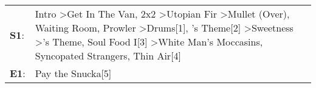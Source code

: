 \begin{supertabular}{p{0.03\textwidth}p{0.92\textwidth}}
 \textbf{S1}:  &  Intro\textsuperscript{} \textgreater \enspace Get In The Van\textsuperscript{}, \enspace 2x2\textsuperscript{} \textgreater \enspace Utopian Fir\textsuperscript{} \textgreater \enspace Mullet (Over)\textsuperscript{}, \enspace Waiting Room\textsuperscript{}, \enspace Prowler\textsuperscript{} \textgreater \enspace Drums[1]\textsuperscript{}, 's Theme[2]\textsuperscript{} \textgreater \enspace Sweetness\textsuperscript{} \textgreater {}'s Theme\textsuperscript{}, \enspace Soul Food I[3]\textsuperscript{} \textgreater \enspace White Man's Moccasins\textsuperscript{}, \enspace Syncopated Strangers\textsuperscript{}, \enspace Thin Air[4]\textsuperscript{}  \enspace  \\
 \textbf{E1}:  &                                                                                                                                                                                                                                                                                                                                                                                                                                                                                                                                                                                                                                                                      Pay the Snucka[5]\textsuperscript{}  \enspace  \\
\end{supertabular}
